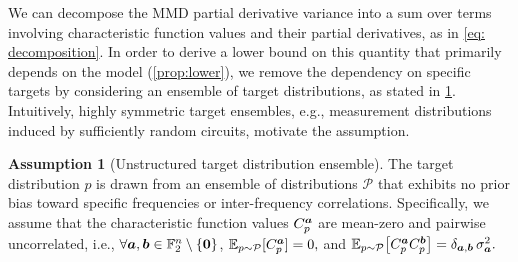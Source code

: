\documentclass{article}
\theoremstyle{plain}
\theoremstyle{definition}
\newtheorem{assumption}[theorem]{Assumption}
\theoremstyle{remark}
\begin{document}
We can decompose the MMD partial derivative variance into a sum over terms involving characteristic function values and their partial derivatives, as in \cref{eq: decomposition}. In order to derive a lower bound on this quantity that primarily depends on the model (\cref{prop:lower}), we remove the dependency on specific targets by considering an ensemble of target distributions, as stated in \cref{ass:avgcase-target}. Intuitively, highly symmetric target ensembles, e.g., measurement distributions induced by sufficiently random circuits, motivate the assumption.
\begin{assumption}[Unstructured target distribution ensemble]
\label{ass:avgcase-target}
The target distribution $p$ is drawn from an ensemble of distributions $\mathcal P$ that exhibits no prior bias toward specific frequencies or inter-frequency correlations. Specifically, we assume that the characteristic function values $C_p^{{\bm{a}}}$ are mean-zero and pairwise uncorrelated, i.e., $\forall{\bm{a}}, {\bm{b}} \in \mathbb{F}_2^n \setminus \{\bm{0}\}$,
$\operatorname*{\mathbb {E}}_{p\sim\mathcal {P}}[C_p^{{\bm{a}}}]=0,
$ and $
\operatorname*{\mathbb {E}}_{p\sim\mathcal {P}}\!\left[C_p^{{\bm{a}}}C_p^{{\bm{b}}}\right]=\delta_{{\bm{a}},{\bm{b}}}\,\sigma_{{\bm{a}}}^2.$
\end{assumption}
\end{document}
